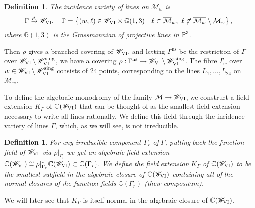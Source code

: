 \documentclass[a4paper,reqno]{amsart}
\numberwithin{equation}{section}
\newcommand{\C}{\mathbb{C}}
\newcommand{\p}{\mathbb{P}}
\newtheorem{definition}[theorem]{Definition}
\numberwithin{equation}{section}
\begin{document}
\begin{definition}\label{def:coveringpvi}
    The incidence variety of lines on $\mathcal{M}_w$ is  
    \begin{equation*}
        \Gamma \xrightarrow{\rho} \mathscr{W}_{\rm{VI}}, \quad  \Gamma = \left\{ (w,\ell) \in \mathscr{W}_{\rm{VI}}\times \mathbb{G}(1,3) ~|~ \ell\subset \overline{\mathcal{M}}_w, \,\,\ell\not\subset \overline{\mathcal{M}_w}\setminus\mathcal{M}_w \right\},
    \end{equation*}
    where $\mathbb{G}(1,3)$ is the Grassmannian of projective lines in $\p^3$.
\end{definition}
Then $\rho$ gives a branched covering of $\mathscr{W}_{\rm{VI}}$, and letting $\Gamma^{\operatorname{ns}}$ be the restriction of $\Gamma$ over $\mathscr{W}_{\rm{VI}}\setminus\mathscr{W}_{\rm{VI}}^{\operatorname{sing}}$, we have a covering $\rho : \Gamma^{\operatorname{ns}} \to \mathscr{W}_{\rm{VI}}\setminus\mathscr{W}_{\rm{VI}}^{\operatorname{sing}}$.
The fibre $\Gamma_w$ over $w\in\mathscr{W}_{\rm{VI}}\setminus \mathscr{W}_{
\rm{VI}}^{\operatorname{sing}}$ consists of 24 points, corresponding to the lines $L_1,\dots,L_{24}$ on $\mathcal{M}_w$. 

To define the algebraic monodromy of the family $\mathcal{M} \to \mathscr{W}_{\rm{VI}}$, we construct a field extension $K_{\Gamma}$ of $\C(\mathscr{W}_{\rm{VI}})$ that can be thought of as the smallest field extension necessary to write all lines rationally. 
We define this field through the incidence variety of lines $\Gamma$, which, as we will see, is not irreducible.
\begin{definition} \label{def:KgammaPVI}
    For any irreducible component $\Gamma_r$ of $\Gamma$, pulling back the function field of $\mathscr{W}_{\rm{VI}}$ via $\rho|_{\Gamma_{r}}$ we get an algebraic field extension $\C(\mathscr{W}_{\rm{VI}})\cong\rho|_{\Gamma_{r}}^*\C(\mathscr{W}_{\rm{VI}})\subset \C(\Gamma_r)$.
    We define the field extension $K_{\Gamma}$ of $\C(\mathscr{W}_{\rm{VI}})$ to be the smallest subfield in the algebraic closure of $\C(\mathscr{W}_{\rm{VI}})$ containing all of the normal closures of the function fields $\C(\Gamma_r)$ (their {compositum}).
\end{definition}
We will later see that $K_{\Gamma}$ is itself normal in the algebraic closure of $\C(\mathscr{W}_{\rm{VI}})$.
\end{document}
